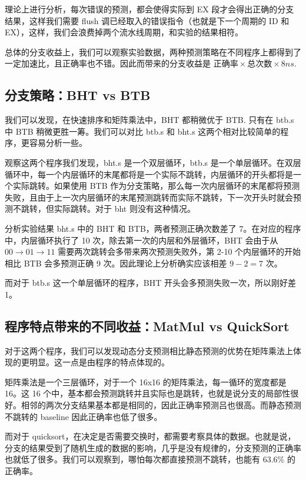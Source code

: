 \documentclass{article}
\begin{document}
理论上进行分析，每次错误的预测，都会使得实际到 EX 段才会得出正确的分支结果，这样我们需要 flush 调已经取入的错误指令（也就是下一个周期的 ID 和 EX），这样，我们会浪费掉两个流水线周期，和实验的结果相符。

总体的分支收益上，我们可以观察实验数据，两种预测策略在不同程序上都得到了一定加速比，且正确率也不错。因此而带来的分支收益是 $正确率 \times 总次数 \times 8ns$.

\subsection{分支策略：BHT vs BTB}
我们可以发现，在快速排序和矩阵乘法中，BHT 都稍微优于 BTB. 只有在 btb.s 中 BTB 稍微更胜一筹。我们可以对比 btb.s 和 bht.s 这两个相对比较简单的程序，更容易分析一些。

观察这两个程序我们发现，bht.s 是一个双层循环，btb.s 是一个单层循环。在双层循环中，每一个内层循环的末尾都将是一个实际不跳转，内层循环的开头都将是一个实际跳转。如果使用 BTB 作为分支策略，那么每一次内层循环的末尾都将预测失败，且由于上一次内层循环的末尾预测跳转而实际不跳转，下一次开头时就会预测不跳转，但实际跳转。对于 bht 则没有这种情况。

分析实验结果 bht.s 中的 BHT 和 BTB，两者预测正确次数差了 7。在对应的程序中，内层循环执行了 10 次，除去第一次的内层和外层循环，BHT 会由于从 $00 \rightarrow 01 \rightarrow 11$ 需要两次跳转会多带来两次预测失败外，第 2-10 个内层循环的开始相比 BTB 会多预测正确 9 次。因此理论上分析确实应该相差 $9 - 2 = 7$ 次。

而对于 btb.s 这一个单层循环的程序，BHT 开头会多预测失败一次，所以刚好差 1。

\subsection{程序特点带来的不同收益：MatMul vs QuickSort}

对于这两个程序，我们可以发现动态分支预测相比静态预测的优势在矩阵乘法上体现的更明显。这一点是由程序的特点体现的。

矩阵乘法是一个三层循环，对于一个 16x16 的矩阵乘法，每一循环的宽度都是 16。这 16 个中，基本都会预测跳转并且实际也是跳转，也就是说分支的局部性很好。相邻的两次分支结果基本都是相同的，因此正确率预测吕也很高。而静态预测不跳转的 baseline 因此正确率也低了很多。

而对于 quicksort，在决定是否需要交换时，都需要考察具体的数据。也就是说，分支的结果受到了随机生成的数据的影响，几乎是没有规律的，分支预测的正确率也就低了很多。我们可以观察到，哪怕每次都直接预测不跳转，也能有 63.6\% 的正确率。
\end{document}
